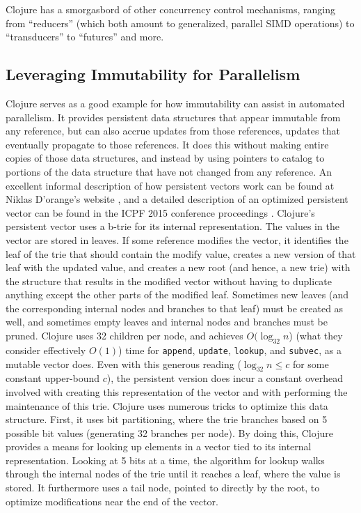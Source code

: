 \documentclass[pageno]{jpaper}
\begin{document}
Clojure has a smorgasbord of other concurrency control mechanisms, ranging from
``reducers'' (which both amount to generalized, parallel SIMD operations) to
``transducers'' to ``futures'' and more.

\subsection{Leveraging Immutability for Parallelism}

Clojure serves as a good example for how immutability can assist in automated
parallelism. It provides persistent data structures that appear immutable from
any reference, but can also accrue updates from those references, updates that
eventually propagate to those references. It does this without making entire
copies of those data structures, and instead by using pointers to catalog to
portions of the data structure that have not changed from any reference. An
excellent informal description of how persistent vectors work can be found at
Niklas D'orange's website \cite{persvec1}, and a detailed description of an
optimized persistent vector can be found in the ICPF 2015 conference proceedings
\cite{rrb_vec}.  Clojure’s persistent vector uses a b-trie for its internal
representation. The values in the vector are stored in leaves. If some reference
modifies the vector, it identifies the leaf of the trie that should contain the
modify value, creates a new version of that leaf with the updated value, and
creates a new root (and hence, a new trie) with the structure that results in
the modified vector without having to duplicate anything except the other parts
of the modified leaf. Sometimes new leaves (and the corresponding internal nodes
and branches to that leaf) must be created as well, and sometimes empty leaves
and internal nodes and branches must be pruned. Clojure uses 32 children per
node, and achieves $O(\log_{32} n$) (what they consider effectively $O(1)$)
time for \texttt{append}, \texttt{update}, \texttt{lookup}, and \texttt{subvec},
as a mutable vector does. Even with this generous reading ($\log_{32} n \leq c$
for some constant upper-bound $c$), the persistent version does incur a constant
overhead involved with creating this representation of the vector and with
performing the maintenance of this trie. Clojure uses numerous tricks to
optimize this data structure. First, it uses bit partitioning, where the trie
branches based on 5 possible bit values (generating 32 branches per node). By
doing this, Clojure provides a means for looking up elements in a vector tied to
its internal representation. Looking at 5 bits at a time, the algorithm for
lookup walks through the internal nodes of the trie until it reaches a leaf,
where the value is stored. It furthermore uses a tail node, pointed to directly
by the root, to optimize modifications near the end of the vector.
\end{document}
